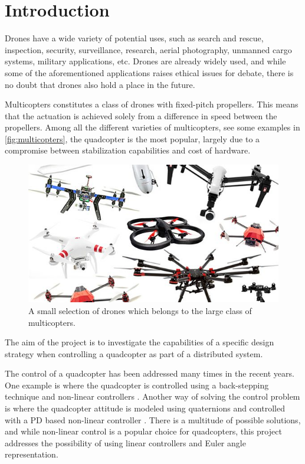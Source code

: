 \chapter{Introduction}\label{chap:Introduction}
Drones have a wide variety of potential uses, such as search and rescue, inspection, security, surveillance, research, aerial photography, unmanned cargo systems, military applications, etc. Drones are already widely used, and while some of the aforementioned applications raises ethical issues for debate, there is no doubt that drones also hold a place in the future.

Multicopters constitutes a class of drones with fixed-pitch propellers. This means that the actuation is achieved solely from a difference in speed between the propellers. Among all the different varieties of multicopters, see some examples in \autoref{fig:multicopters}, the quadcopter is the most popular, largely due to a compromise between stabilization capabilities and cost of hardware. \cite{TypesOfMulticopter}

\begin{figure}[H]
  \centering
  \includegraphics[width=.6\linewidth]{figures/multicopters}
  \caption{A small selection of drones which belongs to the large class of multicopters. \cite{multiCopterPhoto}}
  \label{fig:multicopters}
\end{figure}

The aim of the project is to investigate the capabilities of a specific design strategy when controlling a quadcopter as part of a distributed system.

The control of a quadcopter has been addressed many times in the recent years. One example is where the quadcopter is controlled using a back-stepping technique and non-linear controllers \cite{backstepping}. Another way of solving the control problem is where the quadcopter attitude is modeled using quaternions and controlled with a PD based non-linear controller \cite{quaternionsPD}. There is a multitude of possible solutions, and while non-linear control is a popular choice for quadcopters, this project addresses the possibility of using linear controllers and Euler angle representation.

